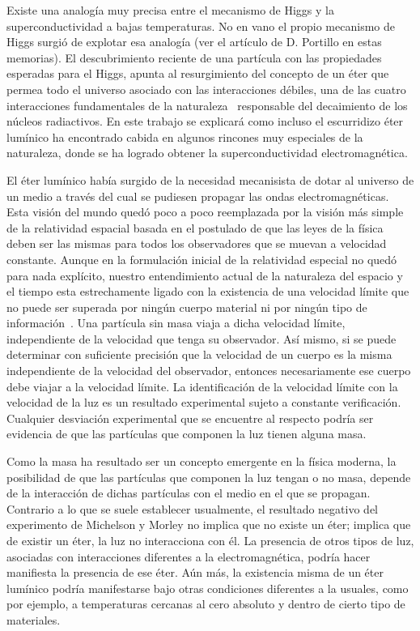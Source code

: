 Existe una analogía muy precisa entre el mecanismo de Higgs y la superconductividad a bajas temperaturas. No en vano el propio mecanismo de Higgs surgió de explotar esa analogía (ver el artículo de D. Portillo en estas memorias). El descubrimiento reciente de una partícula con las propiedades esperadas para el Higgs, apunta al resurgimiento del concepto de  un éter que permea todo el universo asociado con las interacciones débiles, una de las cuatro interacciones fundamentales de la naturaleza~\cite{pi} responsable del decaimiento de los núcleos radiactivos. En este trabajo se explicará como incluso el escurridizo éter lumínico ha encontrado cabida en algunos rincones muy especiales de la naturaleza, donde se ha logrado obtener la superconductividad electromagnética.   

El éter lumínico había surgido de la necesidad mecanisista de dotar al universo de un medio a través del cual se pudiesen propagar las ondas electromagnéticas. Esta visión del mundo quedó poco a poco reemplazada por la visión más simple de la relatividad espacial basada en el postulado de que las leyes de la física deben ser las mismas para todos los observadores que se muevan a velocidad constante. Aunque en la formulación inicial de la relatividad especial no quedó para nada explícito, nuestro entendimiento actual de la naturaleza del espacio y el tiempo esta estrechamente ligado con la existencia de una velocidad límite que no puede ser superada por ningún cuerpo material ni por ningún tipo de información~\cite{0708.0929}. Una partícula sin masa viaja a dicha velocidad límite, independiente de la velocidad que tenga su observador. Así mismo, si se puede determinar con suficiente precisión que la velocidad de un cuerpo es la misma independiente de la velocidad del observador, entonces necesariamente ese cuerpo debe viajar a la velocidad límite. La identificación de la velocidad límite con la velocidad de la luz es un resultado experimental sujeto a constante verificación. Cualquier desviación experimental que se encuentre al respecto podría ser evidencia de que las partículas que componen la luz tienen alguna masa.

Como la masa ha resultado ser un concepto emergente en la física moderna, la posibilidad de que las partículas que componen la luz tengan o no masa, depende de la interacción de dichas partículas con el medio en el que se propagan. Contrario a lo que se suele establecer usualmente, el resultado negativo del experimento de Michelson y Morley \cite{EMM} no implica que no existe un éter; implica que de existir un éter, la luz no interacciona con él. La presencia de otros tipos de luz, asociadas con interacciones diferentes a la electromagnética, podría hacer manifiesta la presencia de ese éter.  Aún más, la existencia misma de un éter lumínico podría manifestarse bajo otras condiciones diferentes a la usuales, como por ejemplo, a temperaturas cercanas al cero absoluto y dentro de cierto tipo de materiales.

